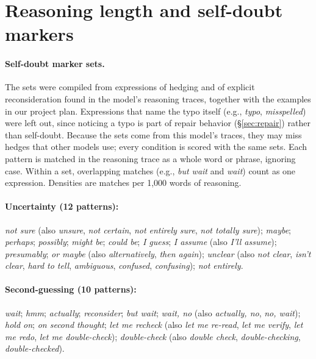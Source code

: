 \documentclass[11pt]{article}
\begin{document}
\section{Reasoning length and self-doubt markers}\label{app:doubt}

\paragraph{Self-doubt marker sets.} The sets were compiled from expressions of hedging and of explicit reconsideration found in the model's reasoning traces, together with the examples in our project plan. Expressions that name the typo itself (e.g., \emph{typo}, \emph{misspelled}) were left out, since noticing a typo is part of repair behavior (\S\ref{sec:repair}) rather than self-doubt. Because the sets come from this model's traces, they may miss hedges that other models use; every condition is scored with the same sets. Each pattern is matched in the reasoning trace as a whole word or phrase, ignoring case. Within a set, overlapping matches (e.g., \emph{but wait} and \emph{wait}) count as one expression. Densities are matches per 1,000 words of reasoning.

\paragraph{Uncertainty (12 patterns):} \emph{not sure} (also \emph{unsure}, \emph{not certain}, \emph{not entirely sure}, \emph{not totally sure}); \emph{maybe}; \emph{perhaps}; \emph{possibly}; \emph{might be}; \emph{could be}; \emph{I guess}; \emph{I assume} (also \emph{I'll assume}); \emph{presumably}; \emph{or maybe} (also \emph{alternatively}, \emph{then again}); \emph{unclear} (also \emph{not clear}, \emph{isn't clear}, \emph{hard to tell}, \emph{ambiguous}, \emph{confused}, \emph{confusing}); \emph{not entirely}.

\paragraph{Second-guessing (10 patterns):} \emph{wait}; \emph{hmm}; \emph{actually}; \emph{reconsider}; \emph{but wait}; \emph{wait, no} (also \emph{actually, no}, \emph{no, wait}); \emph{hold on}; \emph{on second thought}; \emph{let me recheck} (also \emph{let me re-read}, \emph{let me verify}, \emph{let me redo}, \emph{let me double-check}); \emph{double-check} (also \emph{double check}, \emph{double-checking}, \emph{double-checked}).
\end{document}

